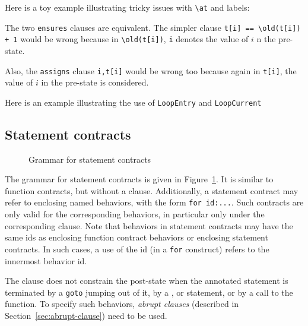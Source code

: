 \begin{example}
  Here is a toy example illustrating tricky issues with \lstinline|\at| and
  labels:


  The two \lstinline|ensures| clauses are equivalent. The simpler clause
  \lstinline|t[i] == \old(t[i]) + 1| would be wrong because in
  \lstinline|\old(t[i])|, \lstinline|i| denotes the value of $i$ n the
  pre-state.

  Also, the \lstinline|assigns| clause \lstinline|i,t[i]| would be
  wrong too because again in \lstinline|t[i]|, the value of $i$ in the
  pre-state is considered.

\end{example}

\begin{example}
Here is an example illustrating the use of \lstinline|LoopEntry| and
\lstinline|LoopCurrent|

\end{example}

\subsection{Statement contracts}
\label{sec:statement_contract}
\begin{figure}[t]
  \begin{cadre}
    
  \end{cadre}
  \caption{Grammar for statement contracts}
  \label{fig:gram:stcontracts}
\end{figure}

The grammar for statement contracts is given in
Figure~\ref{fig:gram:stcontracts}. It is similar to function
contracts, but without a \decreases{} clause. Additionally, a statement contract
may refer to enclosing named behaviors, with the form
\lstinline|for id:...|.
Such contracts are only valid for the
corresponding behaviors, in particular only under the
corresponding \assumes{} clause.
Note that behaviors in statement contracts may have the same ids as enclosing function contract behaviors
or enclosing statement contracts.
In such cases, a use of the id (in a \lstinline|for| construct) refers to the innermost behavior id.


The \ensures{} clause does not constrain the
post-state when the annotated statement is terminated 
by a \lstinline|goto| jumping out of it,
by a \Break{}, \Continue{} or \Return{} statement,
or by a call to the \exit{} function.
To specify such behaviors, \textsl{abrupt clauses} (described in
Section~\ref{sec:abrupt-clause}) need to be used.

